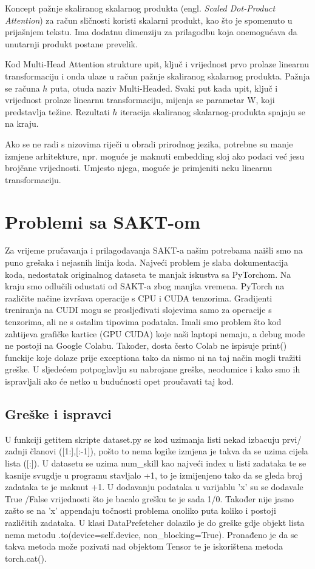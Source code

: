	Koncept pažnje skaliranog skalarnog produkta (engl. \textit{Scaled Dot-Product Attention}) za račun sličnosti koristi skalarni produkt, kao što je spomenuto u prijašnjem tekstu. Ima dodatnu dimenziju za prilagodbu koja onemogućava da unutarnji produkt postane prevelik.

	Kod Multi-Head Attention strukture upit, ključ i vrijednost prvo prolaze linearnu transformaciju i onda ulaze u račun pažnje skaliranog skalarnog produkta. Pažnja se računa $h$ puta, otuda naziv Multi-Headed.  Svaki put kada upit, ključ i vrijednost prolaze linearnu transformaciju, mijenja se parametar W, koji predstavlja težine. Rezultati $h$ iteracija skaliranog skalarnog-produkta spajaju se na kraju.

	Ako se ne radi s nizovima riječi u obradi prirodnog jezika, potrebne su manje izmjene arhitekture, npr. moguće je maknuti embedding sloj ako podaci već jesu brojčane vrijednosti. Umjesto njega, moguće je primjeniti neku linearnu transformaciju.


	\section{Problemi sa SAKT-om}
	Za vrijeme pručavanja i prilagođavanja SAKT-a našim potrebama naišli smo na puno grešaka i nejasnih linija koda. Najveći problem je slaba dokumentacija koda, nedostatak originalnog dataseta te manjak iskustva sa PyTorchom.
	Na kraju smo odlučili odustati od SAKT-a zbog manjka vremena. PyTorch na različite načine izvršava operacije s CPU i CUDA tenzorima. Gradijenti treniranja na CUDI mogu se prosljeđivati slojevima samo za operacije s tenzorima, ali ne s ostalim tipovima podataka. Imali smo problem što kod zahtijeva grafičke kartice (GPU CUDA) koje naši laptopi nemaju, a debug mode ne postoji na Google Colabu. Također, dosta često Colab ne ispisuje print() funckije koje dolaze prije exceptiona tako da nismo ni na taj način mogli tražiti greške. U sljedećem potpoglavlju su nabrojane greške, neodumice i kako smo ih ispravljali ako će netko u budućnosti opet proučavati taj kod.
	\subsection{Greške i ispravci}
	
		U funkciji getitem skripte dataset.py se kod uzimanja listi nekad izbacuju prvi/ zadnji članovi ([1:],[:-1]), pošto to nema logike izmjena je takva da se uzima cijela lista ([:]). U datasetu se uzima num\_skill kao najveći index u listi zadataka te se kasnije svugdje u programu stavljalo +1, to je izmijenjeno tako da se gleda broj zadataka te je maknut +1. U dodavanju podataka u varijablu 'x' su se dodavale True /False vrijednosti što je bacalo grešku te je sada 1/0. Također nije jasno zašto se na 'x' appendaju točnosti problema onoliko puta koliko i postoji različitih zadataka. U klasi DataPrefetcher dolazilo je do greške gdje objekt lista nema metodu .to(device=self.device, non\_blocking=True). Pronađeno je da se takva metoda može pozivati nad objektom Tensor te je iskorištena metoda torch.cat().
		
